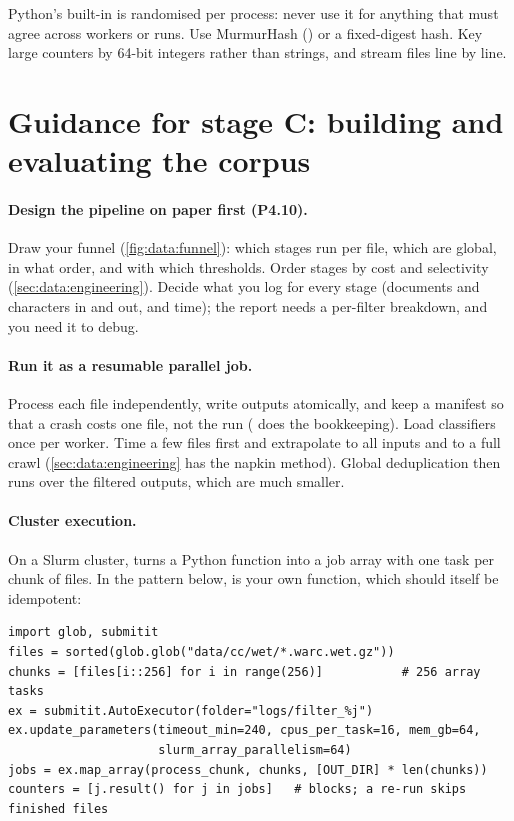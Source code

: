 \begin{pitfall}
Python's built-in  is randomised per process: never use it for anything that must
agree across workers or runs. Use MurmurHash () or a fixed-digest hash. Key large counters
by 64-bit integers rather than strings, and stream files line by line.
\end{pitfall}

\section{Guidance for stage C: building and evaluating the corpus}\label{sec:proj4:part3}

\paragraph{Design the pipeline on paper first (P4.10).} Draw your funnel (\cref{fig:data:funnel}):
which stages run per file, which are global, in what order, and with which thresholds. Order
stages by cost and selectivity (\cref{sec:data:engineering}). Decide what you log for every stage
(documents and characters in and out, and time); the report needs a per-filter breakdown, and you
need it to debug.

\paragraph{Run it as a resumable parallel job.} Process each file independently, write outputs
atomically, and keep a manifest so that a crash costs one file, not the run (
does the bookkeeping). Load classifiers once per worker. Time a few files first and extrapolate to all
inputs and to a full crawl (\cref{sec:data:engineering} has the napkin method). Global deduplication then
runs over the filtered outputs, which are much smaller.

\paragraph{Cluster execution.} On a Slurm cluster,  turns a Python function into a job
array with one task per chunk of files. In the pattern below,  is your own function,
which should itself be idempotent:

\begin{lstlisting}
import glob, submitit
files = sorted(glob.glob("data/cc/wet/*.warc.wet.gz"))
chunks = [files[i::256] for i in range(256)]           # 256 array tasks
ex = submitit.AutoExecutor(folder="logs/filter_%j")
ex.update_parameters(timeout_min=240, cpus_per_task=16, mem_gb=64,
                     slurm_array_parallelism=64)
jobs = ex.map_array(process_chunk, chunks, [OUT_DIR] * len(chunks))
counters = [j.result() for j in jobs]   # blocks; a re-run skips finished files
\end{lstlisting}

